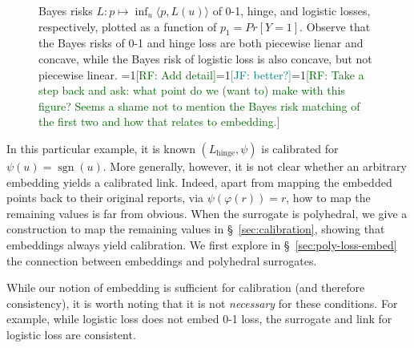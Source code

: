 \documentclass[11pt]{article}
\newcommand{\Comments}{1}
\newcommand{\mynote}[2]{\ifnum\Comments=1\textcolor{#1}{#2}\fi}
\newcommand{\raf}[1]{\mynote{darkgreen}{[RF: #1]}}
\newcommand{\jessie}[1]{\mynote{teal}{[JF: #1]}}
\newcommand{\simplex}{\Delta_\Y}
\newcommand{\R}{\mathcal{R}}
\newcommand{\Y}{\mathcal{Y}}
\newcommand{\inprod}[2]{\langle #1, #2 \rangle}%
\newcommand{\hinge}{L_{\mathrm{hinge}}}
\newcommand{\ellzo}{\ell_{\text{0-1}}}
\DeclareMathOperator*{\sgn}{sgn}
\begin{document}
\begin{figure}
\begin{minipage}{0.3\linewidth}
\end{minipage}
\caption{Bayes risks $L : p \mapsto \inf_u \inprod{p}{L(u)}$ of 0-1, hinge, and logistic losses, respectively, plotted as a function of $p_1 = Pr[Y=1]$.
	Observe that the Bayes risks of 0-1 and hinge loss are both piecewise lienar and concave, while the Bayes risk of logistic loss is also concave, but not piecewise linear.  \raf{Add detail}\jessie{better?}\raf{Take a step back and ask: what point do we (want to) make with this figure? Seems a shame not to mention the Bayes risk matching of the first two and how that relates to embedding.}}
\label{fig:bayes-risks-01}
\end{figure}

In this particular example, it is known $(\hinge,\psi)$ is calibrated for $\psi(u) = \sgn(u)$.
More generally, however, it is not clear whether an arbitrary embedding yields a calibrated link.
Indeed, apart from mapping the embedded points back to their original reports, via $\psi(\varphi(r)) = r$, how to map the remaining values is far from obvious.
When the surrogate is polyhedral, we give a construction to map the remaining values in \S~\ref{sec:calibration}, showing that embeddings always yield calibration.
We first explore in \S~\ref{sec:poly-loss-embed} the connection between embeddings and polyhedral surrogates.

While our notion of embedding is sufficient for calibration (and therefore consistency), it is worth noting that it is not \emph{necessary} for these conditions.  
For example, while logistic loss does not embed 0-1 loss, the surrogate and link for logistic loss are consistent.


\end{document}
